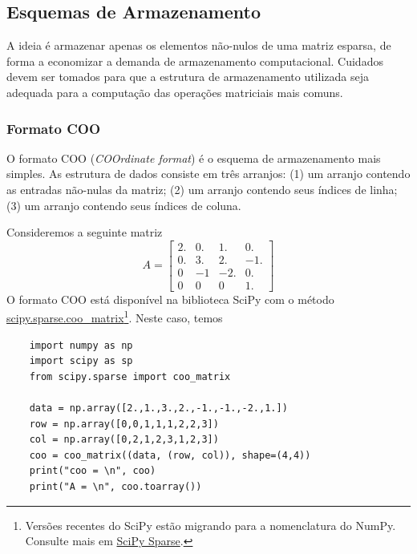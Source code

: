 \subsection{Esquemas de Armazenamento}

A ideia é armazenar apenas os elementos não-nulos de uma matriz esparsa, de forma a economizar a demanda de armazenamento computacional. Cuidados devem ser tomados para que a estrutura de armazenamento utilizada seja adequada para a computação das operações matriciais mais comuns.

\subsubsection{Formato COO}

O formato COO ({\it COOrdinate format}) é o esquema de armazenamento mais simples. As estrutura de dados consiste em três arranjos: (1) um arranjo contendo as entradas não-nulas da matriz; (2) um arranjo contendo seus índices de linha; (3) um arranjo contendo seus índices de coluna.

\begin{ex}\label{ex:coo}
  Consideremos a seguinte matriz
  \begin{equation}
    A =
    \begin{bmatrix}
      2. & 0. & 1.  & 0.\\
      0. & 3. & 2.  & -1.\\
      0  & -1 & -2. & 0.\\
      0  & 0  & 0   & 1.
    \end{bmatrix}
  \end{equation}
  O formato COO está disponível na biblioteca SciPy com o método \href{https://docs.scipy.org/doc/scipy/reference/generated/scipy.sparse.coo_matrix.html}{scipy.sparse.coo\_matrix}\footnote{Versões recentes do SciPy estão migrando para a nomenclatura do NumPy. Consulte mais em \href{https://docs.scipy.org/doc/scipy/reference/sparse.html}{SciPy Sparse}.}. Neste caso, temos
  \begin{lstlisting}
    import numpy as np
    import scipy as sp
    from scipy.sparse import coo_matrix

    data = np.array([2.,1.,3.,2.,-1.,-1.,-2.,1.])
    row = np.array([0,0,1,1,1,2,2,3])
    col = np.array([0,2,1,2,3,1,2,3])
    coo = coo_matrix((data, (row, col)), shape=(4,4))
    print("coo = \n", coo)
    print("A = \n", coo.toarray())
  \end{lstlisting}
\end{ex}

